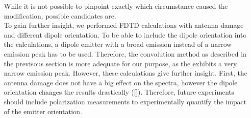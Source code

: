 			While it is not possible to pinpoint exactly which circumstance caused the modification, possible candidates are.
			\\
			To gain further insight, we performed FDTD calculations with antenna damage and different dipole orientation.
			To be able to include the dipole orientation into the calculations, a dipole emitter with a broad emission instead of a narrow emission peak has to be used.
			Therefore, the convolution method as described in the previsous section is more adequate for our purpose, as the \siv exhibits a very narrow emission peak.
			However, these calculations give further insight.
			First, the antenna damage does not have a big effect on the spectra, however the dipole orientation changes the results drastically (\cref{}).
			Therefore, future experiments should include polarization measurements to experimentally quantify the impact of the emitter orientation.

